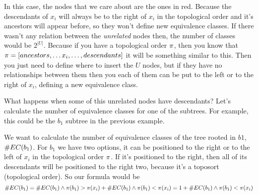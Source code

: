 In this case, the nodes that we care about are the ones in red. Because the descendants of $x_i$ will always be to the right of $x_i$ in the topological order and it's ancestors will appear before, so they won't define new equivalence classes. If there wasn't any relation between the \emph{unrelated} nodes then, the number of classes would be $2^{|U|}$. Because if you have a topological order $\pi$, then you know that $\pi =  \left[ ancestors, \dots x_i , \dots , descendants  \right] $ it will be something similar to this. Then you just need to define where to insert the $U$ nodes, but if they have no relationships between them then you each of them can be put to the left or to the right of $x_i$, defining a new equivalence class. 

What happens when some of this unrelated nodes have descendants? Let's calculate the number of equivalence classes for one of the subtrees. For example, this could be the $b_1$ subtree in the previous example. 

\begin{figure}[ht]
\centering 
\end{figure}

We want to calculate the number of equivalence classes of the tree rooted in $b1$, $\#EC(b_1)$. For $b_1$ we have two options, it can be positioned to the right or to the left of $x_i$ in the topological order $\pi$. If it's positioned to the right, then all of its descendants will be positioned to the right two, because it's a toposort (topological order). 
So our formula would be $$\#EC(b_1) = \#EC(b_1) \land \pi(b_1) > \pi(x_i) + \#EC(b_1) \land \pi(b_1) < \pi(x_i)  = 1 + \#EC(b_1) \land \pi(b_1) < \pi(x_i) $$

